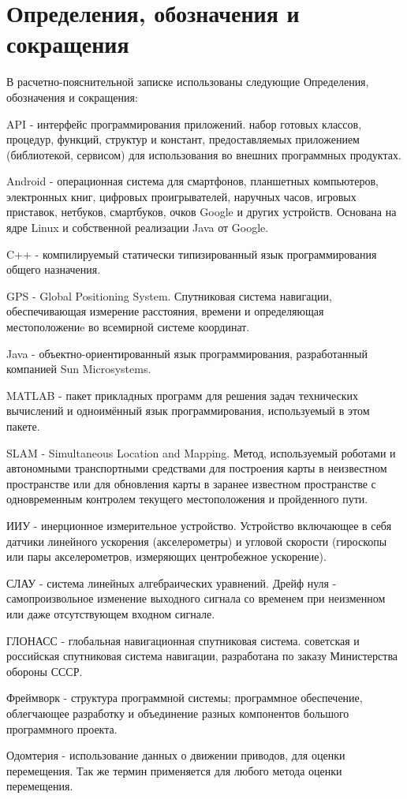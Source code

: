 \newpage
\section*{Определения, обозначения и сокращения}

В расчетно-пояснительной записке использованы следующие Определения, обозначения и сокращения:

API - интерфейс программирования приложений. набор готовых классов, процедур, функций, структур и констант, предоставляемых приложением (библиотекой, сервисом) для использования во внешних программных продуктах.

Android -  операционная система для смартфонов, планшетных компьютеров, электронных книг, цифровых проигрывателей, наручных часов, игровых приставок, нетбуков, смартбуков, очков Google и других устройств. Основана на ядре Linux и собственной реализации Java от Google.

C++ - компилируемый статически типизированный язык программирования общего назначения.

GPS - Global Positioning System.  Спутниковая система навигации, обеспечивающая измерение расстояния, времени и определяющая местоположениe во всемирной системе координат. 

Java -  объектно-ориентированный язык программирования, разработанный компанией Sun Microsystems.

MATLAB -  пакет прикладных программ для решения задач технических вычислений и одноимённый язык программирования, используемый в этом пакете.

SLAM - Simultaneous Location and Mapping. Метод, используемый роботами и автономными транспортными средствами для построения карты в неизвестном пространстве или для обновления карты в заранее известном пространстве с одновременным контролем текущего местоположения и пройденного пути.

ИИУ - инерционное измерительное устройство. Устройство включающее в себя датчики линейного ускорения (акселерометры) и угловой скорости (гироскопы или пары акселерометров, измеряющих центробежное ускорение).  
 
СЛАУ - система линейных алгебраических уравнений.
Дрейф нуля - самопроизвольное изменение выходного сигнала со временем при неизменном или даже отсутствующем входном сигнале.

ГЛОНАСС - глобальная навигационная спутниковая система. советская и российская спутниковая система навигации, разработана по заказу Министерства обороны СССР.

Фреймворк - структура программной системы; программное обеспечение, облегчающее разработку и объединение разных компонентов большого программного проекта.

Одомтерия - использование данных о движении приводов, для оценки перемещения. Так же термин применяется для любого метода оценки перемещения.